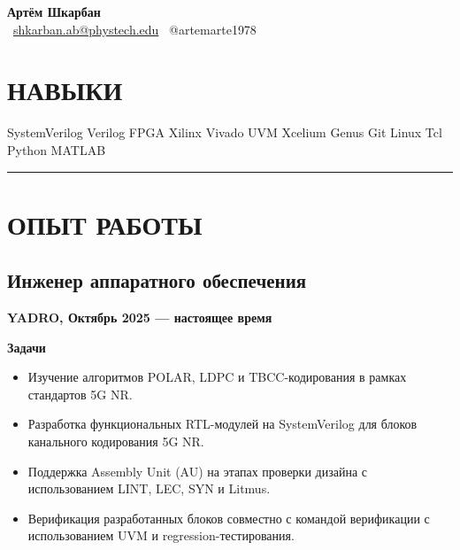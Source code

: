 \documentclass[10pt, a4paper]{article}
\begin{document}

\begin{center}
    {\LARGE \textbf{Артём Шкарбан}} \\[0.5em]

    \faEnvelope\
    \href{mailto:shkarban.ab@phystech.edu}
    {shkarban.ab@phystech.edu}
    \quad
    \faTelegram\ @artemarte1978
\end{center}


\section*{НАВЫКИ}

SystemVerilog
\quad
Verilog
\quad
FPGA
\quad
Xilinx Vivado
\quad
UVM
\quad
Xcelium
\quad
Genus
\quad
Git
\quad
Linux
\quad
Tcl
\quad
Python
\quad
MATLAB

\rule{\linewidth}{2pt}


\section*{ОПЫТ РАБОТЫ}


\subsection*{Инженер аппаратного обеспечения}

\textbf{YADRO, Октябрь 2025 --- настоящее время}

\textbf{Задачи}

\begin{itemize}
    \item Изучение алгоритмов POLAR, LDPC и TBCC-кодирования в рамках стандартов 5G NR.
    \item Разработка функциональных RTL-модулей на SystemVerilog для блоков канального кодирования 5G NR.
    \item Поддержка Assembly Unit (AU) на этапах проверки дизайна с использованием LINT, LEC, SYN и Litmus.
    \item Верификация разработанных блоков совместно с командой верификации с использованием UVM и regression-тестирования.
\end{itemize}
\end{document}
